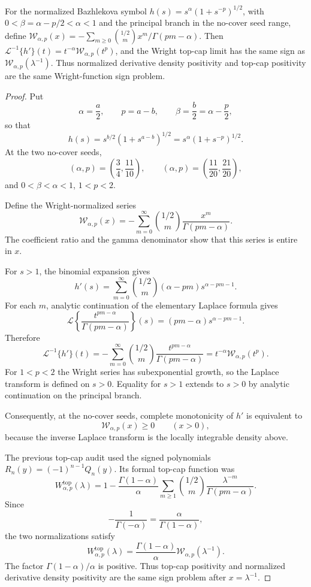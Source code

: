 \begin{lemma}
\label{res:bazhlekova-wright-density-topcap-bridge-normal-form}
For the normalized Bazhlekova symbol \(h(s)=s^\alpha(1+s^{-p})^{1/2}\), with \(0<\beta=\alpha-p/2<\alpha<1\) and the principal branch in the no-cover seed range, define \(\mathcal W_{\alpha,p}(x)=-\sum_{m\ge0}\binom{1/2}{m}x^m/\Gamma(pm-\alpha)\). Then \(\mathcal L^{-1}\{h'\}(t)=t^{-\alpha}\mathcal W_{\alpha,p}(t^p)\), and the Wright top-cap limit has the same sign as \(\mathcal W_{\alpha,p}(\lambda^{-1})\). Thus normalized derivative density positivity and top-cap positivity are the same Wright-function sign problem.
\end{lemma}
\begin{proof}
Put
\[
\alpha=\frac a2,\qquad p=a-b,\qquad \beta=\frac b2=\alpha-\frac p2,
\]
so that
\[
h(s)=s^{b/2}(1+s^{a-b})^{1/2}
=s^\alpha(1+s^{-p})^{1/2}.
\]
At the two no-cover seeds,
\[
(\alpha,p)=\left(\frac34,\frac{11}{10}\right),
\qquad
(\alpha,p)=\left(\frac{11}{20},\frac{21}{20}\right),
\]
and \(0<\beta<\alpha<1\), \(1<p<2\).

Define the Wright-normalized series
\[
\mathcal W_{\alpha,p}(x)
=
-\sum_{m=0}^{\infty}
\binom{1/2}{m}\frac{x^m}{\Gamma(pm-\alpha)}.
\]
The coefficient ratio and the gamma denominator show that this series is entire in \(x\).

For \(s>1\), the binomial expansion gives
\[
h'(s)
=
\sum_{m=0}^{\infty}
\binom{1/2}{m}(\alpha-pm)s^{\alpha-pm-1}.
\]
For each \(m\), analytic continuation of the elementary Laplace formula gives
\[
\mathcal L\left\{
\frac{t^{pm-\alpha}}{\Gamma(pm-\alpha)}
\right\}(s)
=(pm-\alpha)s^{\alpha-pm-1}.
\]
Therefore
\[
\mathcal L^{-1}\{h'\}(t)
=
-\sum_{m=0}^{\infty}
\binom{1/2}{m}
\frac{t^{pm-\alpha}}{\Gamma(pm-\alpha)}
=
t^{-\alpha}\mathcal W_{\alpha,p}(t^p).
\]
For \(1<p<2\) the Wright series has subexponential growth, so the Laplace transform is defined on \(s>0\). Equality for \(s>1\) extends to \(s>0\) by analytic continuation on the principal branch.

Consequently, at the no-cover seeds, complete monotonicity of \(h'\) is equivalent to
\[
\mathcal W_{\alpha,p}(x)\ge0
\qquad(x>0),
\]
because the inverse Laplace transform is the locally integrable density above.

The previous top-cap audit used the signed polynomials \(R_n(y)=(-1)^{n-1}Q_n(y)\). Its formal top-cap function was
\[
W^{\mathrm{top}}_{\alpha,p}(\lambda)
=
1-\frac{\Gamma(1-\alpha)}{\alpha}
\sum_{m\ge1}\binom{1/2}{m}
\frac{\lambda^{-m}}{\Gamma(pm-\alpha)}.
\]
Since
\[
-\frac1{\Gamma(-\alpha)}
=\frac{\alpha}{\Gamma(1-\alpha)},
\]
the two normalizations satisfy
\[
W^{\mathrm{top}}_{\alpha,p}(\lambda)
=
\frac{\Gamma(1-\alpha)}{\alpha}
\mathcal W_{\alpha,p}(\lambda^{-1}).
\]
The factor \(\Gamma(1-\alpha)/\alpha\) is positive. Thus top-cap positivity and normalized derivative density positivity are the same sign problem after \(x=\lambda^{-1}\).
\end{proof}

